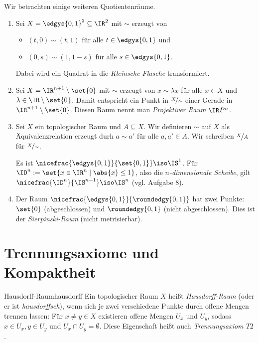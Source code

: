 \documentclass[language=ngerman]{TemplateLecture} %
\begin{document}
\begin{example}
    Wir betrachten einige weiteren Quotientenräume.
    \begin{enumerate}[$(1)$]
        \item Sei $X = \edgys{0,1}^2 \subseteq \IR^2$ mit $\sim$ erzeugt von 
        \begin{itemize}
            \item $(t,0) \sim (t,1)$ für alle $t \in \edgys{0,1}$ und
            \item $(0,s) \sim (1, 1-s)$ für alle $s \in \edgys{0,1}$.
        \end{itemize}
        Dabei wird ein Quadrat in die \emph{Kleinsche Flasche} transformiert.
        \item Sei $X = \IR^{n+1} \setminus \set{0}$ mit $\sim$ erzeugt von $x \sim \lambda x$ für alle $x \in X$ und $\lambda \in \IR \setminus \set{0}$. Damit entspricht ein Punkt in $\nicefrac{X}{\sim}$ einer Gerade in $\IR^{n+1} \setminus \set{0}$. Diesen Raum nennt man \emph{Projektiver Raum} $\IR P^n$.
        \item Sei $X$ ein topologischer Raum und $A \subseteq X$. Wir definieren $\sim$ auf $X$ als Äquivalenzrelation erzeugt durh $a \sim a'$ für alle $a, a' \in A$. Wir schreiben $\nicefrac{X}{A}$ für $\nicefrac{X}{\sim}$. 
        
        Es ist $\nicefrac{\edgys{0,1}}{\set{0,1}} \iso \IS^1$. Für $\ID^n := \set{x \in \IR^n \mid \abs{x} \leq 1}$, also die \emph{$n$-dimensionale Scheibe}, gilt $\nicefrac{\ID^n}{\IS^{n-1}} \iso \IS^n$ (vgl. Aufgabe 8).
        \item Der Raum $\nicefrac{\edgys{0,1}}{\roundedgy{0,1}}$ hat zwei  Punkte: $\set{0}$ (abgeschlossen) und $\roundedgy{0,1}$ (nicht abgeschlossen). Dies ist der \emph{Sierpinski-Raum} (nicht metrisierbar).
    \end{enumerate}
\end{example}

\chapter{Trennungsaxiome und Kompaktheit}
\begin{defi}{Hausdorff-Raum}{hausdorff}
    Ein topologischer Raum $X$ heißt \emph{Hausdorff-Raum} (oder er ist \emph{hausdorffsch}), wenn sich je zwei verschiedene Punkte durch offene Mengen trennen lassen: Für $x \neq y \in X$ existieren offene Mengen $U_x$ und $U_y$, sodass $x \in U_x, y \in  U_y$ und $U_x \cap U_y = \emptyset$. Diese Eigenschaft heißt auch \emph{Trennungsaxiom $T2$}.
\end{defi}
\end{document}
